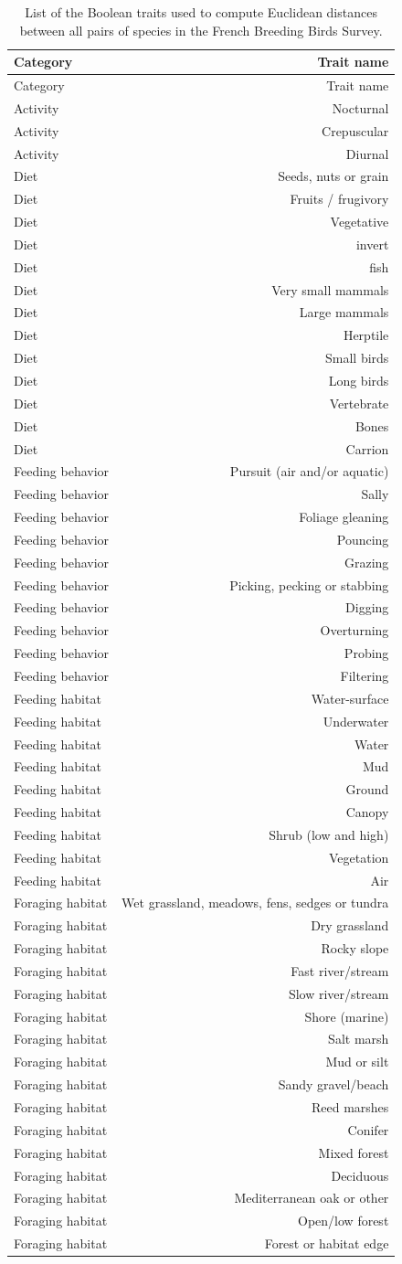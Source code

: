 \begin{longtable}[]{@{}lr@{}}
\caption{List of the Boolean traits used to compute Euclidean distances
between all pairs of species in the French Breeding Birds Survey.
\label{tbl:trtfbbs}}\tabularnewline
\toprule
Category & Trait name\tabularnewline
\midrule
\endfirsthead
\toprule
Category & Trait name\tabularnewline
\midrule
\endhead
Activity & Nocturnal\tabularnewline
Activity & Crepuscular\tabularnewline
Activity & Diurnal\tabularnewline
Diet & Seeds, nuts or grain\tabularnewline
Diet & Fruits / frugivory\tabularnewline
Diet & Vegetative\tabularnewline
Diet & invert\tabularnewline
Diet & fish\tabularnewline
Diet & Very small mammals\tabularnewline
Diet & Large mammals\tabularnewline
Diet & Herptile\tabularnewline
Diet & Small birds\tabularnewline
Diet & Long birds\tabularnewline
Diet & Vertebrate\tabularnewline
Diet & Bones\tabularnewline
Diet & Carrion\tabularnewline
Feeding behavior & Pursuit (air and/or aquatic)\tabularnewline
Feeding behavior & Sally\tabularnewline
Feeding behavior & Foliage gleaning\tabularnewline
Feeding behavior & Pouncing\tabularnewline
Feeding behavior & Grazing\tabularnewline
Feeding behavior & Picking, pecking or stabbing\tabularnewline
Feeding behavior & Digging\tabularnewline
Feeding behavior & Overturning\tabularnewline
Feeding behavior & Probing\tabularnewline
Feeding behavior & Filtering\tabularnewline
Feeding habitat & Water-surface\tabularnewline
Feeding habitat & Underwater\tabularnewline
Feeding habitat & Water\tabularnewline
Feeding habitat & Mud\tabularnewline
Feeding habitat & Ground\tabularnewline
Feeding habitat & Canopy\tabularnewline
Feeding habitat & Shrub (low and high)\tabularnewline
Feeding habitat & Vegetation\tabularnewline
Feeding habitat & Air\tabularnewline
Foraging habitat & Wet grassland, meadows, fens, sedges or
tundra\tabularnewline
Foraging habitat & Dry grassland\tabularnewline
Foraging habitat & Rocky slope\tabularnewline
Foraging habitat & Fast river/stream\tabularnewline
Foraging habitat & Slow river/stream\tabularnewline
Foraging habitat & Shore (marine)\tabularnewline
Foraging habitat & Salt marsh\tabularnewline
Foraging habitat & Mud or silt\tabularnewline
Foraging habitat & Sandy gravel/beach\tabularnewline
Foraging habitat & Reed marshes\tabularnewline
Foraging habitat & Conifer\tabularnewline
Foraging habitat & Mixed forest\tabularnewline
Foraging habitat & Deciduous\tabularnewline
Foraging habitat & Mediterranean oak or other\tabularnewline
Foraging habitat & Open/low forest\tabularnewline
Foraging habitat & Forest or habitat edge\tabularnewline

\end{longtable}
